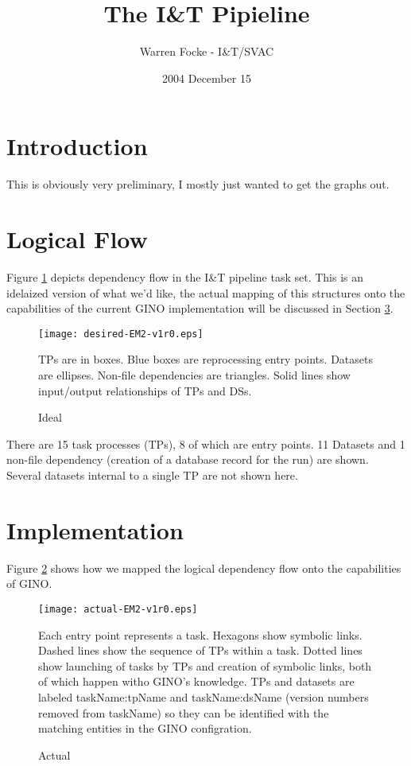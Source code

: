\documentclass{article}
\begin{document}
\title{The I\&T Pipieline}
\author{Warren Focke - I\&T/SVAC}
\date{2004 December 15}
\maketitle


\section{Introduction}
\label{intro-sec}

This is obviously very preliminary, I mostly just wanted to get the graphs
out.


\section{Logical Flow}
\label{logic-sec}

Figure \ref{desired-fig} depicts dependency flow in the I\&T pipeline task set.
This is an idelaized version of what we'd like, the actual mapping of this
structures onto the capabilities of the current GINO implementation will be
discussed in Section \ref{implement-sec}.

\begin{figure}
\label{desired-fig}
\caption{Ideal}

\texttt{[image: desired-EM2-v1r0.eps]}

{TPs are in boxes. Blue boxes are reprocessing entry points.  Datasets are
ellipses. Non-file dependencies are triangles.  Solid lines show input/output
relationships of TPs and DSs.}

\end{figure}

There are 15 task processes (TPs), 8 of which are entry points.  11 Datasets
and 1 non-file dependency (creation of a database record for the run) are
shown.  Several datasets internal to a single TP are not shown here.




\section{Implementation}
\label{implement-sec}

Figure \ref{actual-fig} shows how we mapped the logical dependency flow onto
the capabilities of GINO.

\begin{figure}
\label{actual-fig}
\caption{Actual}

\texttt{[image: actual-EM2-v1r0.eps]}

{Each entry point represents a task.  Hexagons show symbolic links. Dashed
lines show the sequence of TPs within a task.  Dotted lines show launching of
tasks by TPs and creation of symbolic links, both of which happen witho GINO's
knowledge.  TPs and datasets are labeled taskName:tpName and taskName:dsName
(version numbers removed from taskName) so they can be identified with the
matching entities in the GINO configration.}

\end{figure}
\end{document}
